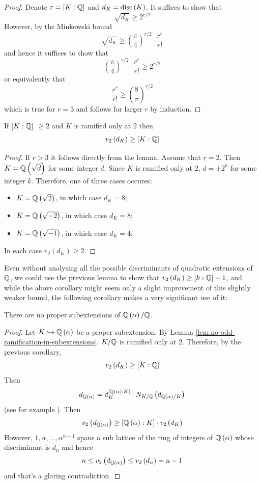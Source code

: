 \documentclass[../main.tex]{subfiles}
\begin{document}
\begin{proof}
  Denote $r = \left[ K : \mathbb{Q} \right]$ and $d_K = \operatorname{disc}\left( K \right)$.
  It suffices to show that 
  \[
    \sqrt{d_K} \geq 2^{r/2}
  \]
  However, by the Minkowski bound 
  \[
    \sqrt{d_K} \geq \left( \frac{\pi}{4} \right)^{r/2} \cdot \frac{r^r}{r!}
  \]
  and hence it suffices to show that 
  \[
    \left( \frac{\pi}{4} \right)^{r/2} \cdot \frac{r^r}{r!} \geq 2^{r/2}
  \]
  or equivalently that 
  \[
    \frac{r^r}{r!} \geq \left( \frac{8}{\pi} \right)^{r/2}
  \]
  which is true for $r = 3$ and follows for larger $r$ by induction.
\end{proof}
\begin{corollary}
  If $\left[ K:\mathbb{Q} \right]$ $\geq 2$ and $K$ is ramified only at $2$ then
  \[
    v_2\left( d_{K} \right) \geq \left[ K : \mathbb{Q} \right]
  \]
\end{corollary}
\begin{proof}
  If $r > 3$ it follows directly from the lemma.
  Assume that $r = 2$.
  Then $K = \mathbb{Q}\left( \sqrt{d} \right)$ for some integer $d$.
  Since $K$ is ramified only at $2$, $d = \pm 2^{k}$ for some integer $k$.
  Therefore, one of three cases occures: 
  \begin{itemize}
    \item $K = \mathbb{Q}\left( \sqrt{2} \right)$, in which case $d_K = 8$;
    \item $K = \mathbb{Q}\left( \sqrt{-2} \right)$, in which case $d_K = 8$;
    \item $K = \mathbb{Q}\left( \sqrt{-1} \right)$, in which case $d_K = 4$;
  \end{itemize}
  In each case $v_2\left( d_{K} \right) \geq 2$.
\end{proof}
Even without analysing all the possible discriminants of quadratic extensions of $\mathbb{Q}$, we could use the previous lemma to show that $v_2\left( d_{K} \right) \geq \left[ k:\mathbb{Q} \right] - 1$, and while the above corollary might seem only a slight improvement of this slightly weaker bound, the following corollary makes a very significant use of it: 
\begin{corollary}
  There are no proper subextensions of $\mathbb{Q}\left( \alpha \right)/\mathbb{Q}$.
\end{corollary}
\begin{proof}
  Let $K \hookrightarrow \mathbb{Q}\left( \alpha \right)$ be a proper subextension.
  By Lemma \ref{lem:no-odd-ramification-in-subextensions}, $K/\mathbb{Q}$ is ramified only at $2$.
  Therefore, by the previous corollary,
  \[
    v_2\left( d_{K} \right) \geq \left[ K : \mathbb{Q} \right]
  \]
  Then 
  \[
    d_{\mathbb{Q}\left( \alpha \right)} = 
    d_{K}^{\left[ \mathbb{Q}\left( \alpha \right) : K \right]} \cdot N_{K/\mathbb{Q}}\left( d_{\mathbb{Q}\left( \alpha \right)/K} \right) 
  \]
  (see for example \cite[III.\S 4]{SerreLocalFields}). 
  Then 
  \[
    v_2\left( d_{\mathbb{Q}\left( \alpha \right)} \right) \geq 
    \left[ \mathbb{Q}\left( \alpha \right) : K \right] \cdot v_2\left( d_{K} \right)
  \]
  However, $1, \alpha, \dots, \alpha^{n-1}$ spans a sub lattice of the ring of integers of $\mathbb{Q}\left( \alpha \right)$ whose discriminant is $d_n$ and hence
  \[
    n \leq v_2\left( d_{\mathbb{Q}\left( \alpha \right)} \right) \leq v_2\left( d_n \right) = n-1
  \]
  and that's a glaring contradiction.
\end{proof}
\end{document}
